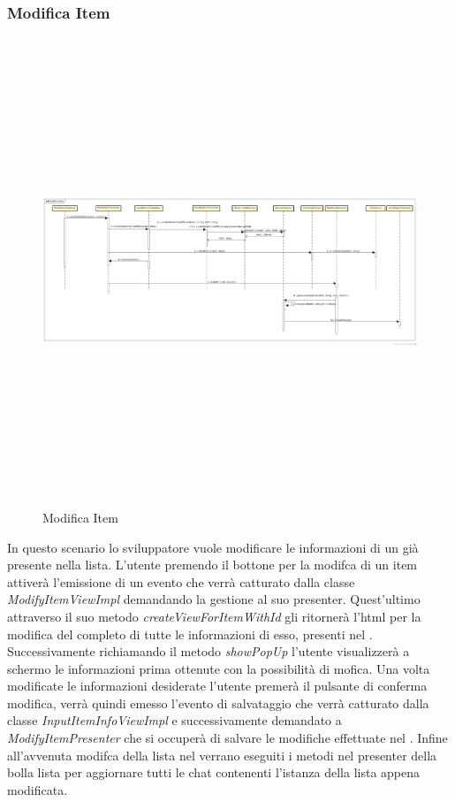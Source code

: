 \subsubsection{Modifica Item}

\label{Modifica Item}
\begin{figure}[H]
	\centering
	\includegraphics[width=16cm, height=14cm]{Sezioni/Diagrammi/img_app/modifica_item.jpg}
	\caption{Modifica Item}
\end{figure}

In questo scenario lo sviluppatore vuole modificare le informazioni di un  già presente nella lista. L'utente premendo il bottone per la modifca di un item attiverà l'emissione di un evento che verrà catturato dalla classe \textit{ModifyItemViewImpl} demandando la gestione al suo presenter. Quest'ultimo attraverso il suo metodo \textit{createViewForItemWithId} gli ritornerà l'html per la modifica del  completo di tutte le informazioni di esso, presenti nel . Successivamente richiamando il metodo \textit{showPopUp} l'utente visualizzerà a schermo le informazioni prima ottenute con la possibilità di mofica. Una volta modificate le informazioni desiderate l'utente premerà il pulsante di conferma modifica, verrà quindi emesso l'evento di salvataggio che verrà catturato dalla classe \textit{InputItemInfoViewImpl} e successivamente demandato a \textit{ModifyItemPresenter} che si occuperà di salvare le modifiche effettuate nel . Infine all'avvenuta modifca della lista nel  verrano eseguiti i metodi nel presenter della bolla lista per aggiornare tutti le chat contenenti l'istanza della lista appena modificata. 

